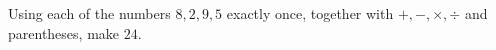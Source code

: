 Using each of the numbers $8,2,9,5$ exactly once, together with $+,-,\times,\div$ and parentheses, make $24$.
